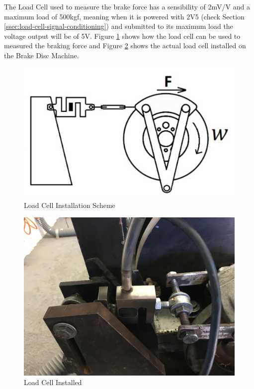 		The Load Cell used to measure the brake force has a sensibility of 2mV/V and a maximum load of 500kgf, meaning when it is powered with 2V5 (check Section \ref{ssec:load-cell-signal-conditioning}) and submitted to its maximum load the voltage output will be of 5V. Figure \ref{fig:load-cell-installation-scheme} shows how the load cell can be used to measured the braking force and Figure \ref{fig:load-cell-installed} shows the actual load cell installed on the Brake Disc Machine.

		\begin{figure}[htbp]
			\centering
			\includegraphics[scale=0.05]{figuras/fig-load-cell-installation-scheme}
			\caption{Load Cell Installation Scheme \cite{load-cell-caxeta2017}}
			\label{fig:load-cell-installation-scheme}
		\end{figure}

		\begin{figure}[htbp]
			\centering
			\includegraphics[scale=0.05]{figuras/fig-load-cell-installed}
			\caption{Load Cell Installed}
			\label{fig:load-cell-installed}
		\end{figure}
		\par

